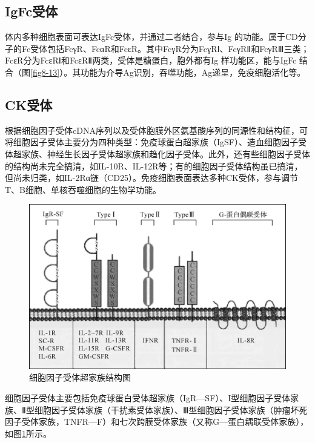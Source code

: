 \subsection{IgFc受体}

体内多种细胞表面可表达IgFc受体，并通过二者结合，参与Ig
的功能。属于CD分子的Fc受体包括FcγR、FcαR和FcεR。其中FcγR分为FcγRⅠ、FcγRⅡ和FcγRⅢ三类；FcεR分为FcεRⅠ和FcεRⅡ两类，受体是糖蛋白，胞外都有Ig
样功能区，能与IgFc
结合（图\ref{fig8-13}）。其功能为介导Ag识别，吞噬功能，Ag递呈，免疫细胞活化等。


\subsection{CK受体}

根据细胞因子受体cDNA序列以及受体胞膜外区氨基酸序列的同源性和结构征，可将细胞因子受体主要分为四种类型：免疫球蛋白超家族（IgSF）、造血细胞因子受体超家族、神经生长因子受体超家族和趋化因子受体。此外，还有些细胞因子受体的结构尚未完全搞清，如IL-10R、IL-12R等；有的细胞因子受体结构虽已搞清，但尚未归类，如IL-2Rα链（CD25）。免疫细胞表面表达多种CK受体，参与调节T、B细胞、单核吞噬细胞的生物学功能。

\begin{figure}[!htbp]
 \centering
 \includegraphics{./images/Image00124.jpg}
 \captionsetup{justification=centering}
 \caption{细胞因子受体超家族结构图}
 \label{fig8-14}
  \end{figure} 

细胞因子受体主要包括免疫球蛋白受体超家族（IgR---SF）、I型细胞因子受体家族、Ⅱ型细胞因子受体家族（干扰素受体家族）、Ⅲ型细胞因子受体家族（肿瘤坏死因子受体家族，TNFR---F）和七次跨膜受体家族（又称G---蛋白耦联受体家族），如图\ref{fig8-14}所示。


